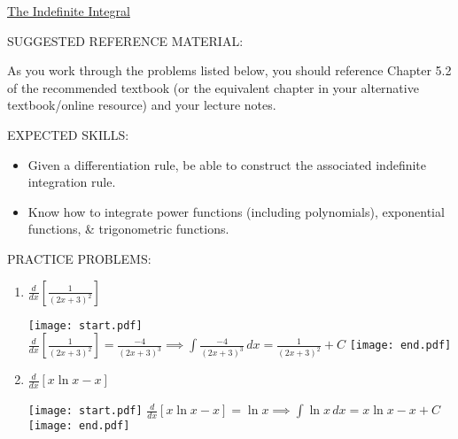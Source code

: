\documentclass[12pt]{article}
\begin{document}
\begin{center}
\underline{\LARGE{The Indefinite Integral}}
\end{center}

\noindent SUGGESTED REFERENCE MATERIAL:

\bigskip

\noindent As you work through the problems listed below, you should reference Chapter 5.2 of the recommended textbook (or the equivalent chapter in your alternative textbook/online resource) and your lecture notes.

\bigskip


\noindent EXPECTED SKILLS:

\begin{itemize}

\item Given a differentiation rule, be able to construct the associated indefinite integration rule. 

\item Know how to integrate power functions (including polynomials), exponential functions, \& trigonometric functions.

\end{itemize}

\noindent PRACTICE PROBLEMS:

\medskip


\begin{enumerate}

\item $\frac{d}{dx}\left[\frac{1}{(2x+3)^2}\right]$ 

\texttt{[image: start.pdf]}
{{$\frac{d}{dx}\left[\frac{1}{(2x+3)^2}\right]=\frac{-4}{(2x+3)^3} \implies \int \frac{-4}{(2x+3)^3} \,dx= \frac{1}{(2x+3)^2}+C$}}
\texttt{[image: end.pdf]}


\item $\frac{d}{dx} [x\ln{x}-x]$ 

\texttt{[image: start.pdf]}
{{$\frac{d}{dx} [x\ln{x}-x]=\ln{x} \implies \int \ln{x} \,dx = x\ln{x}-x+C$}}
\texttt{[image: end.pdf]}


\end{enumerate}

\end{document}

